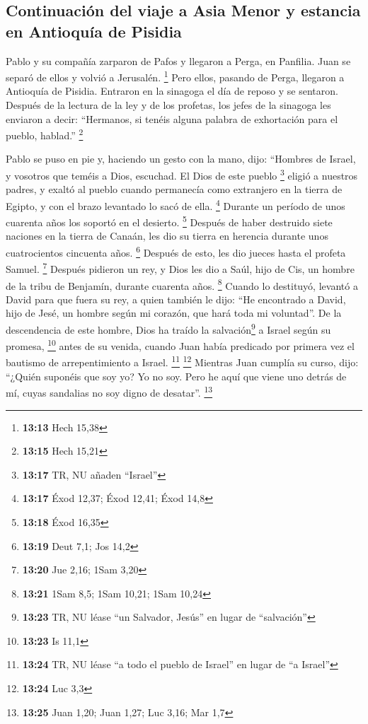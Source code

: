 \hypertarget{continuaciuxf3n-del-viaje-a-asia-menor-y-estancia-en-antioquuxeda-de-pisidia}{%
\subsection{Continuación del viaje a Asia Menor y estancia en Antioquía
de
Pisidia}\label{continuaciuxf3n-del-viaje-a-asia-menor-y-estancia-en-antioquuxeda-de-pisidia}}

 Pablo y su compañía zarparon de Pafos y llegaron a
Perga, en Panfilia. Juan se separó de ellos y volvió a Jerusalén.
\footnote{\textbf{13:13} Hech 15,38}  Pero ellos, pasando
de Perga, llegaron a Antioquía de Pisidia. Entraron en la sinagoga el
día de reposo y se sentaron.  Después de la lectura de la
ley y de los profetas, los jefes de la sinagoga les enviaron a decir:
``Hermanos, si tenéis alguna palabra de exhortación para el pueblo,
hablad.'' \footnote{\textbf{13:15} Hech 15,21}

 Pablo se puso en pie y, haciendo un gesto con la mano,
dijo: ``Hombres de Israel, y vosotros que teméis a Dios, escuchad.
 El Dios de este pueblo \footnote{\textbf{13:17} TR, NU
  añaden ``Israel''} eligió a nuestros padres, y exaltó al pueblo cuando
permanecía como extranjero en la tierra de Egipto, y con el brazo
levantado lo sacó de ella. \footnote{\textbf{13:17} Éxod 12,37; Éxod
  12,41; Éxod 14,8}  Durante un período de unos cuarenta
años los soportó en el desierto. \footnote{\textbf{13:18} Éxod 16,35}
 Después de haber destruido siete naciones en la tierra
de Canaán, les dio su tierra en herencia durante unos cuatrocientos
cincuenta años. \footnote{\textbf{13:19} Deut 7,1; Jos 14,2}
 Después de esto, les dio jueces hasta el profeta Samuel.
\footnote{\textbf{13:20} Jue 2,16; 1Sam 3,20}  Después
pidieron un rey, y Dios les dio a Saúl, hijo de Cis, un hombre de la
tribu de Benjamín, durante cuarenta años. \footnote{\textbf{13:21} 1Sam
  8,5; 1Sam 10,21; 1Sam 10,24}  Cuando lo destituyó,
levantó a David para que fuera su rey, a quien también le dijo: ``He
encontrado a David, hijo de Jesé, un hombre según mi corazón, que hará
toda mi voluntad''.  De la descendencia de este hombre,
Dios ha traído la salvación\footnote{\textbf{13:23} TR, NU léase ``un
  Salvador, Jesús'' en lugar de ``salvación''} a Israel según su
promesa, \footnote{\textbf{13:23} Is 11,1}  antes de su
venida, cuando Juan había predicado por primera vez el bautismo de
arrepentimiento a Israel. \footnote{\textbf{13:24} TR, NU léase ``a todo
  el pueblo de Israel'' en lugar de ``a Israel''} \footnote{\textbf{13:24}
  Luc 3,3}  Mientras Juan cumplía su curso, dijo:
``¿Quién suponéis que soy yo? Yo no soy. Pero he aquí que viene uno
detrás de mí, cuyas sandalias no soy digno de desatar''. \footnote{\textbf{13:25}
  Juan 1,20; Juan 1,27; Luc 3,16; Mar 1,7}

